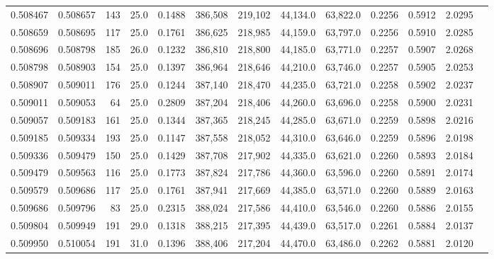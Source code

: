 \begin{tabular}{rrrrrrrrrrrrr}
0.508467 & 0.508657 &   143 & 25.0 &                                     0.1488 & 386,508 & 219,102 &  44,134.0 &  63,822.0 & 0.2256 & 0.5912 & 2.0295 \\
0.508659 & 0.508695 &   117 & 25.0 &                                     0.1761 & 386,625 & 218,985 &  44,159.0 &  63,797.0 & 0.2256 & 0.5910 & 2.0285 \\
0.508696 & 0.508798 &   185 & 26.0 &                                     0.1232 & 386,810 & 218,800 &  44,185.0 &  63,771.0 & 0.2257 & 0.5907 & 2.0268 \\
0.508798 & 0.508903 &   154 & 25.0 &                                     0.1397 & 386,964 & 218,646 &  44,210.0 &  63,746.0 & 0.2257 & 0.5905 & 2.0253 \\
0.508907 & 0.509011 &   176 & 25.0 &                                     0.1244 & 387,140 & 218,470 &  44,235.0 &  63,721.0 & 0.2258 & 0.5902 & 2.0237 \\
0.509011 & 0.509053 &    64 & 25.0 &                                     0.2809 & 387,204 & 218,406 &  44,260.0 &  63,696.0 & 0.2258 & 0.5900 & 2.0231 \\
0.509057 & 0.509183 &   161 & 25.0 &                                     0.1344 & 387,365 & 218,245 &  44,285.0 &  63,671.0 & 0.2259 & 0.5898 & 2.0216 \\
0.509185 & 0.509334 &   193 & 25.0 &                                     0.1147 & 387,558 & 218,052 &  44,310.0 &  63,646.0 & 0.2259 & 0.5896 & 2.0198 \\
0.509336 & 0.509479 &   150 & 25.0 &                                     0.1429 & 387,708 & 217,902 &  44,335.0 &  63,621.0 & 0.2260 & 0.5893 & 2.0184 \\
0.509479 & 0.509563 &   116 & 25.0 &                                     0.1773 & 387,824 & 217,786 &  44,360.0 &  63,596.0 & 0.2260 & 0.5891 & 2.0174 \\
0.509579 & 0.509686 &   117 & 25.0 &                                     0.1761 & 387,941 & 217,669 &  44,385.0 &  63,571.0 & 0.2260 & 0.5889 & 2.0163 \\
0.509686 & 0.509796 &    83 & 25.0 &                                     0.2315 & 388,024 & 217,586 &  44,410.0 &  63,546.0 & 0.2260 & 0.5886 & 2.0155 \\
0.509804 & 0.509949 &   191 & 29.0 &                                     0.1318 & 388,215 & 217,395 &  44,439.0 &  63,517.0 & 0.2261 & 0.5884 & 2.0137 \\
0.509950 & 0.510054 &   191 & 31.0 &                                     0.1396 & 388,406 & 217,204 &  44,470.0 &  63,486.0 & 0.2262 & 0.5881 & 2.0120 \\

\end{tabular}
